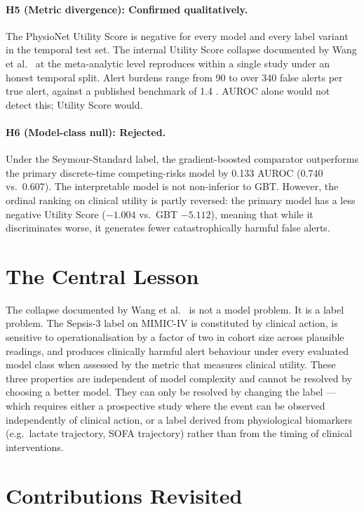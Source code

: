 \paragraph{H5 (Metric divergence): Confirmed qualitatively.}
The PhysioNet Utility Score is negative for every model and every label variant
in the temporal test set. The internal Utility Score collapse documented by Wang
et al.\ \parencite{wang2025srpm} at the meta-analytic level reproduces within
a single study under an honest temporal split. Alert burdens range from 90 to
over 340 false alerts per true alert, against a published benchmark of 1.4
\parencite{moor2023review}. AUROC alone would not detect this; Utility Score
would.

\paragraph{H6 (Model-class null): Rejected.}
Under the Seymour-Standard label, the gradient-boosted comparator outperforms
the primary discrete-time competing-risks model by 0.133 AUROC (0.740 vs.\ 0.607).
The interpretable model is not non-inferior to GBT. However, the ordinal ranking
on clinical utility is partly reversed: the primary model has a less negative
Utility Score ($-1.004$ vs.\ GBT $-5.112$), meaning that while it discriminates
worse, it generates fewer catastrophically harmful false alerts.

\section{The Central Lesson}

The collapse documented by Wang et al.\ \parencite{wang2025srpm} is not a model
problem. It is a label problem. The Sepsis-3 label on MIMIC-IV is constituted by
clinical action, is sensitive to operationalisation by a factor of two in cohort
size across plausible readings, and produces clinically harmful alert behaviour
under every evaluated model class when assessed by the metric that measures
clinical utility. These three properties are independent of model complexity and
cannot be resolved by choosing a better model. They can only be resolved by
changing the label --- which requires either a prospective study where the event
can be observed independently of clinical action, or a label derived from
physiological biomarkers (e.g.\ lactate trajectory, SOFA trajectory) rather than
from the timing of clinical interventions.

\section{Contributions Revisited}

